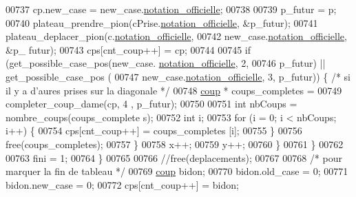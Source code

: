 \begin{DoxyCode}
00737                                 cp.new\_case = new\_case.\hyperlink{structcase__plateau_ad510581b324604a9cf685cbb769a421a}{notation_officielle};
00738 
00739                                 p\_futur = p;
00740                                 plateau\_prendre\_pion(cPrise.\hyperlink{structcase__plateau_ad510581b324604a9cf685cbb769a421a}{notation_officielle}, 
      &p\_futur);
00741                                 plateau\_deplacer\_pion(c.\hyperlink{structcase__plateau_ad510581b324604a9cf685cbb769a421a}{notation_officielle},
00742                                                 new\_case.\hyperlink{structcase__plateau_ad510581b324604a9cf685cbb769a421a}{notation_officielle}, &p\_
      futur);
00743                                 cps[cnt\_coup++] = cp;
00744 
00745                                 \textcolor{keywordflow}{if} (get\_possible\_case\_pos(new\_case.
      \hyperlink{structcase__plateau_ad510581b324604a9cf685cbb769a421a}{notation_officielle}, 2,
00746                                                 p\_futur) || get\_possible\_case\_pos
      (
00747                                                 new\_case.\hyperlink{structcase__plateau_ad510581b324604a9cf685cbb769a421a}{notation_officielle}, 3, 
      p\_futur)) \{ \textcolor{comment}{/* si il y a d'aures prises sur la diagonale */}
00748                                         \hyperlink{structcoup}{coup} * coups\_completes =
00749                                                         completer\_coup\_dame(cp, 4
      , p\_futur);
00750 
00751                                         \textcolor{keywordtype}{int} nbCoups = nombre\_coups(coups\_complete
      s);
00752                                         \textcolor{keywordtype}{int} i;
00753                                         \textcolor{keywordflow}{for} (i = 0; i < nbCoups; i++) \{
00754                                                 cps[cnt\_coup++] = coups\_completes
      [i];
00755                                         \}
00756                                         free(coups\_completes);
00757                                 \}
00758                                 x++;
00759                                 y++;
00760                         \}
00761                 \}
00762 
00763                 fini = 1;
00764         \}
00765 
00766         \textcolor{comment}{//free(deplacements);}
00767 
00768         \textcolor{comment}{/* pour marquer la fin de tableau */}
00769         \hyperlink{structcoup}{coup} bidon;
00770         bidon.old\_case = 0;
00771         bidon.new\_case = 0;
00772         cps[cnt\_coup++] = bidon;

\end{DoxyCode}
